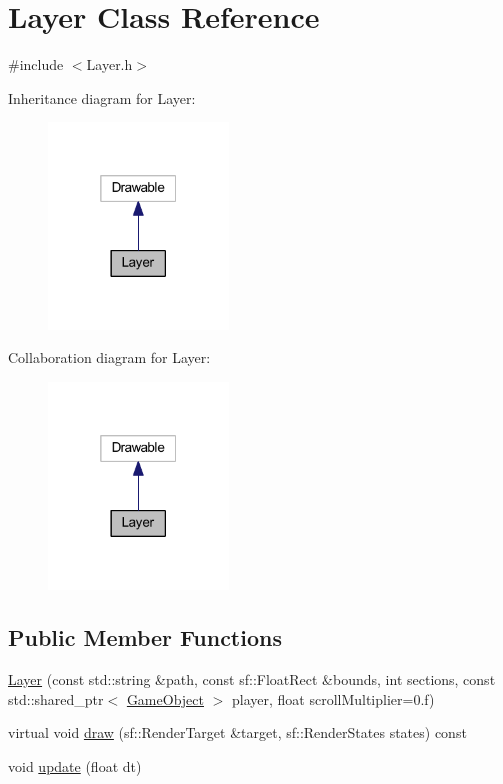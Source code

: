 \hypertarget{class_layer}{}\section{Layer Class Reference}
\label{class_layer}


{\ttfamily \#include $<$Layer.\+h$>$}



Inheritance diagram for Layer\+:\nopagebreak
\begin{figure}[H]
\begin{center}
\leavevmode
\includegraphics[width=136pt]{class_layer__inherit__graph}
\end{center}
\end{figure}


Collaboration diagram for Layer\+:\nopagebreak
\begin{figure}[H]
\begin{center}
\leavevmode
\includegraphics[width=136pt]{class_layer__coll__graph}
\end{center}
\end{figure}
\subsection*{Public Member Functions}
\begin{DoxyCompactItemize}
\item 
\hyperlink{class_layer_a7bb4ab89e6520ccab2fe21bae716f684}{Layer} (const std\+::string \&path, const sf\+::\+Float\+Rect \&bounds, int sections, const std\+::shared\+\_\+ptr$<$ \hyperlink{class_game_object}{Game\+Object} $>$ player, float scroll\+Multiplier=0.f)
\item 
virtual void \hyperlink{class_layer_adffe5112f908beaf0371894287d5870c}{draw} (sf\+::\+Render\+Target \&target, sf\+::\+Render\+States states) const
\item 
void \hyperlink{class_layer_afe3b5bbec379d4ea687df300c4176ae4}{update} (float dt)
\end{DoxyCompactItemize}


